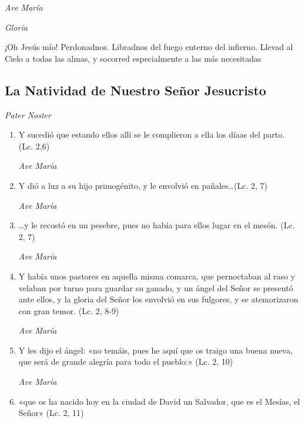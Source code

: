 \documentclass[a4paper,11pt, oneside]{report}
\begin{document}
        \textit{Ave María} \par
        \indent\textit{Gloria} \par
        \indent¡Oh Jesús mío! Perdonadnos. Libradnos del fuego enterno del infierno. Llevad al Cielo a todas las almas, y socorred especialmente a las más 
        necesitadas
            
      \subsection*{La Natividad de Nuestro Señor Jesucristo}
      
        \textit{Pater Noster} 

        \begin{enumerate}
          
          \item Y sucedió que estando ellos allí se le complieron a ella los díaas del parto. (Lc. 2,6)
          
          \textit{Ave María}

          \item Y dió a luz a su hijo primogénito, y le envolvió en pañales\ldots (Lc. 2, 7)
          
          \textit{Ave María}

          \item \ldots y le recostó en un pesebre, pues no había para ellos lugar en el mesón. (Lc. 2, 7)
          
          \textit{Ave María}

          \item Y había unos pastores en aquella misma comarca, que pernoctaban al raso y velaban por turno para guardar su ganado, y un ángel
          del Señor se presentó ante ellos, y la gloria del Señor los envolvió en sus fulgores, y se atemorizaron con gran temor. (Lc. 2, 8-9)
          
          \textit{Ave María}

          \item Y les dijo el ángel: «no temáis, pues he aquí que os traigo una buena nueva, que será de grande alegría para todo el pueblo:» (Lc. 2, 10)

          \textit{Ave María}

          \item «que os ha nacido hoy en la ciudad de David un Salvador, que es el Mesías, el Señor» (Lc. 2, 11)
          

\end{enumerate}
\end{document}
